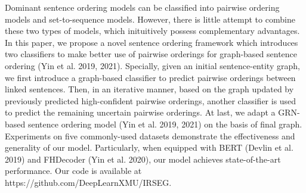 Dominant sentence ordering models can be classified into pairwise ordering models and set-to-sequence models. However, there is little attempt to combine these two types of models, which inituitively possess complementary advantages. In this paper, we propose a novel sentence ordering framework which introduces two classifiers to make better use of pairwise orderings for graph-based sentence ordering (Yin et al. 2019, 2021). Specially, given an initial sentence-entity graph, we first introduce a graph-based classifier to predict pairwise orderings between linked sentences. Then, in an iterative manner, based on the graph updated by previously predicted high-confident pairwise orderings, another classifier is used to predict the remaining uncertain pairwise orderings. At last, we adapt a GRN-based sentence ordering model (Yin et al. 2019, 2021) on the basis of final graph. Experiments on five commonly-used datasets demonstrate the effectiveness and generality of our model. Particularly, when equipped with BERT (Devlin et al. 2019) and FHDecoder (Yin et al. 2020), our model achieves state-of-the-art performance. Our code is available at https://github.com/DeepLearnXMU/IRSEG.

